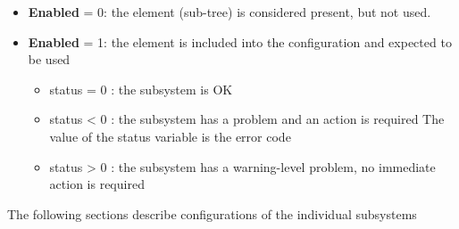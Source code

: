 \begin{itemize}
\item
  {\bf Enabled} = 0: the element (sub-tree) is considered present, but not used.
\item
  {\bf Enabled} = 1: the element is included into the configuration and expected
  to be used
  \begin{itemize}
  \item
    status = 0 : the subsystem is OK
  \item
    status < 0 : the subsystem has a problem and an action is required
    The value of the status variable is the error code
  \item
    status > 0 : the subsystem has a warning-level problem, no immediate action
    is required
  \end{itemize}
\end{itemize}

The following sections describe configurations of the individual subsystems


